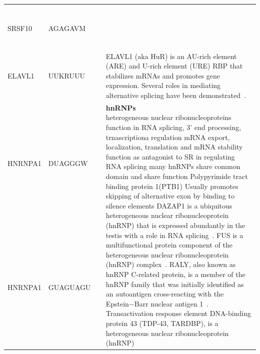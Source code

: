 \documentclass[a4paper,10pt]{article}
\begin{document}
\begin{center}
\begin{longtable}{|l|l|l|p{6cm}|}
 &  \\
 \cline{1-3}
SRSF10 & AGAGAVM & \includegraphics[height=0.8in]{./seqLogo/SRSF10_agagavm.pdf}
 &  \\
 \hline
 ELAVL1 &UUKRUUU  & \includegraphics[height=0.8in]{./seqLogo/HuR_uukruuu.pdf} &
 ELAVL1 (aka HuR) is an AU-rich
element (ARE) and U-rich element (URE) RBP that stabilizes
mRNAs and promotes gene expression. Several roles in mediating alternative splicing have been demonstrated~\cite{Izquierdo2008}.\\
\hline
HNRNPA1 & DUAGGGW & \includegraphics[height=0.8in]{./seqLogo/HNRNPA1_duagggw.pdf}
 & \multirow{22}{6cm}{ 
 \textbf{hnRNPs} \newline
heterogeneous nuclear ribonucleoproteins 
function in RNA splicing, 3’ end processing, trnascriptiona regulation mRNA export, localization, translation and mRNA stability
 function as antagonist to SR in regulating RNA splicing
many hnRNPs share common domain and share function
 Polypyrimide tract binding protein 1(PTB1)
Usually promotes skipping of alternative exon by binding to silence elements
DAZAP1 is a ubiquitous heterogeneous nuclear ribonucleoprotein (hnRNP) that is expressed abundantly in the testis with a role in RNA splicing~\cite{Chen2013}.
FUS is a multifunctional protein component of the heterogeneous nuclear ribonucleoprotein (hnRNP) complex~\cite{Rogelj2012}. RALY, also known as hnRNP
C-related protein, is a member
of the hnRNP family that was initially identified as an
autoantigen cross-reacting with the Epstein−Barr nuclear
antigen 1~\cite{Tenzer2013}.  Transactivation response element DNA-binding protein 43 (TDP-43, TARDBP), is a heterogeneous nuclear ribonucleoprotein (hnRNP)\cite{Ling2015}
 }\\
 \cline{1-3}
HNRNPA1 & GUAGUAGU & \includegraphics[height=0.8in]{./seqLogo/HNRNPA1_guaguagu.pdf}

\end{longtable}
\end{center}
\end{document}
